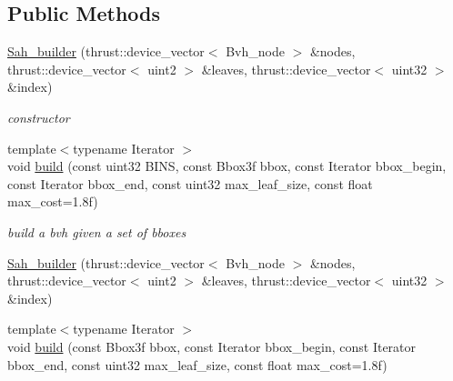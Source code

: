 \subsection*{Public Methods}
\begin{DoxyCompactItemize}
\item 
\mbox{\label{structnih_1_1cuda_1_1_sah__builder_a90fd3637d56da31fcb25f5acae69e12f}} 
\hyperlink{structnih_1_1cuda_1_1_sah__builder_a90fd3637d56da31fcb25f5acae69e12f}{Sah\+\_\+builder} (thrust\+::device\+\_\+vector$<$ Bvh\+\_\+node $>$ \&nodes, thrust\+::device\+\_\+vector$<$ uint2 $>$ \&leaves, thrust\+::device\+\_\+vector$<$ uint32 $>$ \&index)
\begin{DoxyCompactList}\small\item\em constructor \end{DoxyCompactList}\item 
\mbox{\label{structnih_1_1cuda_1_1_sah__builder_a3530e18ffbe8e00d6e2835eb399f375e}} 
{\footnotesize template$<$typename Iterator $>$ }\\void \hyperlink{structnih_1_1cuda_1_1_sah__builder_a3530e18ffbe8e00d6e2835eb399f375e}{build} (const uint32 B\+I\+NS, const Bbox3f bbox, const Iterator bbox\+\_\+begin, const Iterator bbox\+\_\+end, const uint32 max\+\_\+leaf\+\_\+size, const float max\+\_\+cost=1.\+8f)
\begin{DoxyCompactList}\small\item\em build a bvh given a set of bboxes \end{DoxyCompactList}\item 
\hyperlink{structnih_1_1cuda_1_1_sah__builder_a90fd3637d56da31fcb25f5acae69e12f}{Sah\+\_\+builder} (thrust\+::device\+\_\+vector$<$ Bvh\+\_\+node $>$ \&nodes, thrust\+::device\+\_\+vector$<$ uint2 $>$ \&leaves, thrust\+::device\+\_\+vector$<$ uint32 $>$ \&index)
\item 
{\footnotesize template$<$typename Iterator $>$ }\\void \hyperlink{structnih_1_1cuda_1_1_sah__builder_a2d77a187b3d6f0d7a0a3fc7f3c0897a0}{build} (const Bbox3f bbox, const Iterator bbox\+\_\+begin, const Iterator bbox\+\_\+end, const uint32 max\+\_\+leaf\+\_\+size, const float max\+\_\+cost=1.\+8f)
\end{DoxyCompactItemize}
